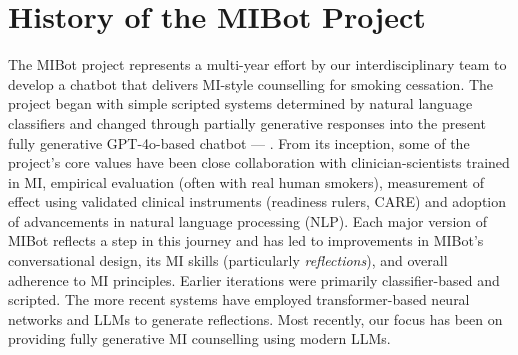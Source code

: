 \chapter{History of the MIBot Project}

\label{app:mibot_version_list}

\noindent The MIBot project represents a multi-year effort by our interdisciplinary team to develop a chatbot that delivers MI-style counselling for smoking cessation. The project began with simple scripted systems determined by natural language classifiers and changed through partially generative responses into the present fully generative GPT-4o-based chatbot — \sysnamewithv. From its inception, some of the project's core values have been close collaboration with clinician-scientists trained in MI, empirical evaluation (often with real human smokers), measurement of effect using validated clinical instruments (readiness rulers, CARE) and adoption of advancements in natural language processing (NLP). Each major version of MIBot reflects a step in this journey and has led to improvements in MIBot's conversational design, its MI skills (particularly \textit{reflections}), and overall adherence to MI principles. Earlier iterations were primarily classifier-based and scripted. The more recent systems have employed transformer-based neural networks and LLMs to generate reflections. Most recently, our focus has been on providing fully generative MI counselling using modern LLMs.

